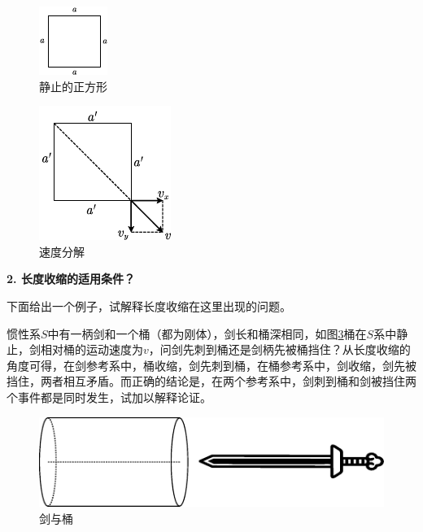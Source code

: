 \documentclass[zihao=-4,UTF8]{report}
\begin{document}
\begin{minipage}[b]{0.45\columnwidth}
  \begin{figure}[H]
    \centering
    \includegraphics[scale=3]{pic/静止正方形.pdf}
    \caption{静止的正方形}
    \label{静止正方形}
  \end{figure}
\end{minipage}%
\begin{minipage}[b]{0.45\columnwidth}
    \begin{figure}[H]
      \centering
      \includegraphics[scale=1.6]{pic/速度分解图.pdf}			
      \caption{速度分解}
      \label{速度分解图}
    \end{figure}
\end{minipage}

\noindent\textbf{2. 长度收缩的适用条件？}\par
下面给出一个例子，试解释长度收缩在这里出现的问题。\par
惯性系$S$中有一柄剑和一个桶（都为刚体），剑长和桶深相同，如图\ref{剑与桶}桶在$S$系中静止，剑相对桶的运动速度为$v$，问剑先刺到桶还是剑柄先被桶挡住？从长度收缩的角度可得，在剑参考系中，桶收缩，剑先刺到桶，在桶参考系中，剑收缩，剑先被挡住，两者相互矛盾。而正确的结论是，在两个参考系中，剑刺到桶和剑被挡住两个事件都是同时发生，试加以解释论证。
\begin{figure}[H]
  \centering
  \includegraphics[scale=1.5]{pic/剑与桶.pdf}		
  \caption{剑与桶}
  \label{剑与桶}
\end{figure}
\end{document}
